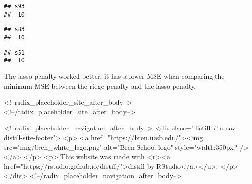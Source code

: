 \documentclass[
]{article}
\newenvironment{Shaded}{\begin{snugshade}}{\end{snugshade}}
\newcommand{\CommentTok}[1]{\textcolor[rgb]{0.56,0.35,0.01}{\textit{#1}}}
\newcommand{\FloatTok}[1]{\textcolor[rgb]{0.00,0.00,0.81}{#1}}
\newcommand{\NormalTok}[1]{#1}
\newcommand{\SpecialCharTok}[1]{\textcolor[rgb]{0.00,0.00,0.00}{#1}}
\begin{document}
\begin{verbatim}
## s93 
##  10
\end{verbatim}

\begin{Shaded}
\end{Shaded}

\begin{verbatim}
## s83 
##  10
\end{verbatim}

\begin{Shaded}
\end{Shaded}

\begin{verbatim}
## s51 
##  10
\end{verbatim}

The lasso penalty worked better; it has a lower MSE when comparing the
minimum MSE between the ridge penalty and the lasso penalty.

<!--radix_placeholder_site_after_body-->
<!--/radix_placeholder_site_after_body-->

<!--radix_placeholder_navigation_after_body-->
<div class="distill-site-nav distill-site-footer">
<p>
<a href="https://bren.ucsb.edu/"><img src="img/bren_white_logo.png" alt="Bren School logo" style="width:350px;" /></a>
</p>
<p>
  This website was made with <u><a href="https://rstudio.github.io/distill/">distill by RStudio</a></u>.
</p>
</div>
<!--/radix_placeholder_navigation_after_body-->
\end{document}
